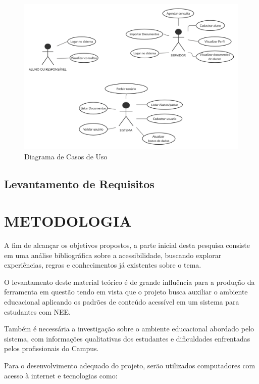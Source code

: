 \begin{figure}[!htb]
    \centering
    \label{fig:figura1}
    \caption{Diagrama de Casos de Uso}
    \includegraphics[width=1.0\textwidth]{./dados/figuras/Casos de uso}
\end{figure}

\section{Levantamento de Requisitos}
\label{sec:requisitos}



\chapter{METODOLOGIA}
\label{chap:metodologia}

A fim de alcançar os objetivos propostos, a parte inicial desta pesquisa consiste em uma análise bibliográfica sobre a acessibilidade, buscando explorar experiências, regras e conhecimentos já existentes sobre o tema. 

O levantamento deste material teórico é de grande influência para a produção da ferramenta em questão tendo em vista que o projeto busca auxiliar o ambiente educacional aplicando os padrões de conteúdo acessível em um sistema para estudantes com NEE. 

Também é necessária a investigação sobre o ambiente educacional abordado pelo sistema, com informações qualitativas dos estudantes e dificuldades enfrentadas pelos profissionais do Campus. 

Para o desenvolvimento adequado do projeto, serão utilizados computadores com acesso à internet e tecnologias como:

